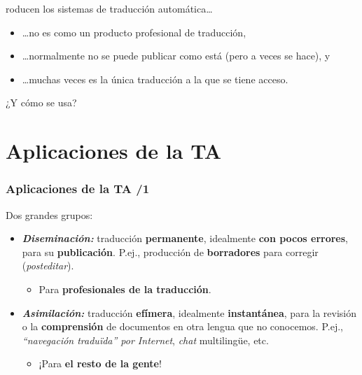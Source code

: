 \documentclass{beamer}
\newcommand{\empha}[1]{\emph{#1}}
\begin{document}
\begin{frame}
roducen los sistemas de traducción automática\ldots\pause
\begin{itemize}
\item \ldots no es como un producto profesional de traducción,\pause
\item \ldots normalmente no se puede publicar como está (pero a veces se hace), y\pause
\item \ldots muchas veces es la única traducción a la que se tiene acceso.\pause
\end{itemize}
¿Y cómo se usa?

\end{frame}




\section{Aplicaciones de la TA}


\begin{frame}
\frametitle{Aplicaciones de la TA /1}
Dos grandes grupos:\pause
\begin{itemize} 

\item\empha{\textbf{Diseminación:}} traducción \textbf{permanente}, idealmente
  \textbf{con pocos errores}, para su  \textbf{publicación}. P.ej.,
  producción de \textbf{borradores} para corregir
  (\textit{posteditar}).\pause
\begin{itemize}
\item Para \textbf{profesionales de la traducción}.\pause
\end{itemize}

\item\empha{\textbf{Asimilación:}} traducción \textbf{efímera}, idealmente
  \textbf{instantánea}, para la revisión o la \textbf{comprensión} de
  documentos en otra lengua que no conocemos. P.ej.,
  \empha{``navegación traduïda'' por Internet}, \textit{chat}
  multilingüe, etc.\pause
  \begin{itemize}
  \item ¡Para \textbf{el resto de la gente}!

  \end{itemize}

\end{itemize}

\end{frame}
\end{document}
